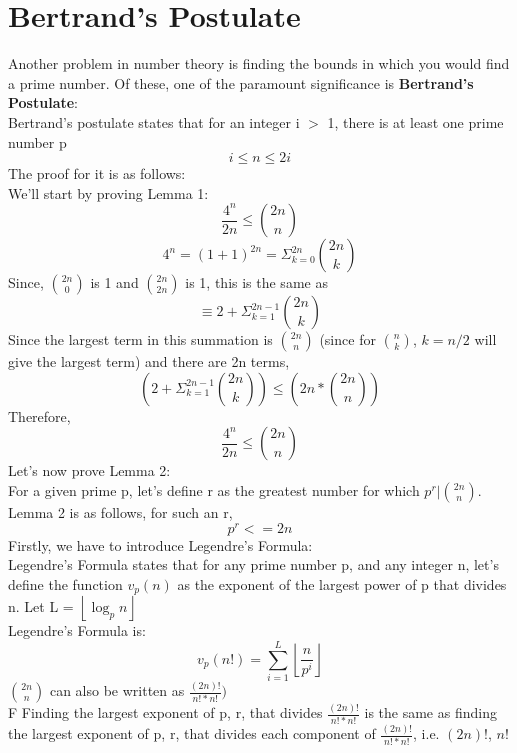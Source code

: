 \documentclass[conference]{IEEEtran}
\begin{document}
\section{Bertrand's Postulate}
Another problem in number theory is finding the bounds in which you would find a prime number. Of these, one of the paramount significance is \textbf{Bertrand's Postulate}: \\
Bertrand's postulate states that for an integer i $>$ 1, there is at least one prime number p
\[
    i \leq n \leq 2i 
\]
The proof for it is as follows:\\
We'll start by proving Lemma 1:\\
\[
    \frac{4^n}{2n} \leq {2n \choose n}
\]
\[
    4^n = (1 + 1)^{2n} = \Sigma_{k = 0}^{2n} {2n \choose k} 
\]
Since, $2n \choose 0$ is 1 and $2n \choose 2n$ is 1, this is the same as
\[
    \equiv 2 + \Sigma_{k = 1}^{2n - 1} {2n \choose k} 
\]
Since the largest term in this summation is $2n \choose n$ (since for $n \choose k$, $k = n/2$ will give the largest term) and there are 2n terms, 
\[
     (2 + \Sigma_{k = 1}^{2n - 1} {2n \choose k}) \leq (2n * {2n \choose n})
\]
Therefore, 
\[
    \frac{4^n}{2n} \leq {2n \choose n}
\]
Let's now prove Lemma 2:\\
For a given prime p, let's define r as the greatest number for which $p^r | {2n \choose n}$. Lemma 2 is as follows, for such an r, 
\[
    p^r <= 2n
\]
Firstly, we have to introduce Legendre's Formula:\\
Legendre's Formula states that for any prime number p, and any integer n, let's define the function $v_p(n)$ as the exponent of the largest power of p that divides n. Let L = $\left\lfloor \log_{p}{n} \right\rfloor$\\
Legendre's Formula is:
\[
    v_{p}(n!) = \sum_{i = 1}^{L} {\left\lfloor \frac{n}{p^i} \right\rfloor}
\]
${2n \choose n}$ can also be written as $\frac{(2n)!}{n!*n!})$\\F
Finding the largest exponent of p, r, that divides $\frac{(2n)!}{n!*n!}$ is the same as finding the largest exponent of p, r, that divides each component of $\frac{(2n)!}{n!*n!}$, i.e. $(2n)!$, $n!$\\
\end{document}
